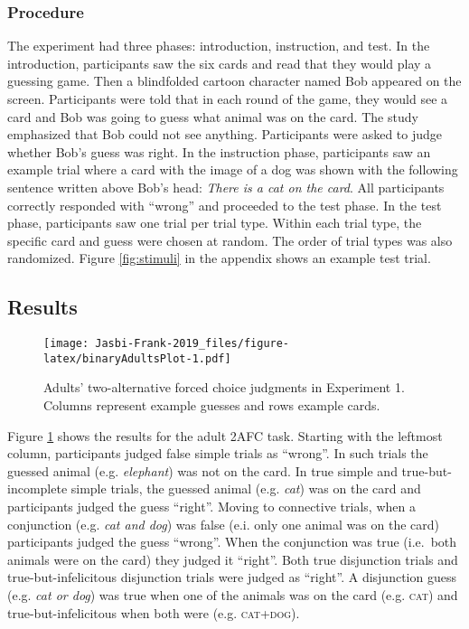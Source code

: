 \documentclass[,man,floatsintext]{apa6}
\begin{document}
\hypertarget{procedure}{%
\subsubsection{Procedure}\label{procedure}}

The experiment had three phases: introduction, instruction, and test. In the introduction, participants saw the six cards and read that they would play a guessing game. Then a blindfolded cartoon character named Bob appeared on the screen. Participants were told that in each round of the game, they would see a card and Bob was going to guess what animal was on the card. The study emphasized that Bob could not see anything. Participants were asked to judge whether Bob's guess was right. In the instruction phase, participants saw an example trial where a card with the image of a dog was shown with the following sentence written above Bob's head: \emph{There is a cat on the card}. All participants correctly responded with \enquote{wrong} and proceeded to the test phase. In the test phase, participants saw one trial per trial type. Within each trial type, the specific card and guess were chosen at random. The order of trial types was also randomized. Figure \ref{fig:stimuli} in the appendix shows an example test trial.

\hypertarget{results}{%
\subsection{Results}\label{results}}

\begin{figure}
\centering
\texttt{[image: Jasbi-Frank-2019\_files/figure-latex/binaryAdultsPlot-1.pdf]}
\caption{\label{fig:binaryAdultsPlot}Adults' two-alternative forced choice judgments in Experiment 1. Columns represent example guesses and rows example cards.}
\end{figure}

Figure \ref{fig:binaryAdultsPlot} shows the results for the adult 2AFC task. Starting with the leftmost column, participants judged false simple trials as \enquote{wrong}. In such trials the guessed animal (e.g. \emph{elephant}) was not on the card. In true simple and true-but-incomplete simple trials, the guessed animal (e.g. \emph{cat}) was on the card and participants judged the guess \enquote{right}. Moving to connective trials, when a conjunction (e.g. \emph{cat and dog}) was false (e.i. only one animal was on the card) participants judged the guess \enquote{wrong}. When the conjunction was true (i.e.~both animals were on the card) they judged it \enquote{right}. Both true disjunction trials and true-but-infelicitous disjunction trials were judged as \enquote{right}. A disjunction guess (e.g. \emph{cat or dog}) was true when one of the animals was on the card (e.g. \textsc{cat}) and true-but-infelicitous when both were (e.g. \textsc{cat+dog}).
\end{document}
